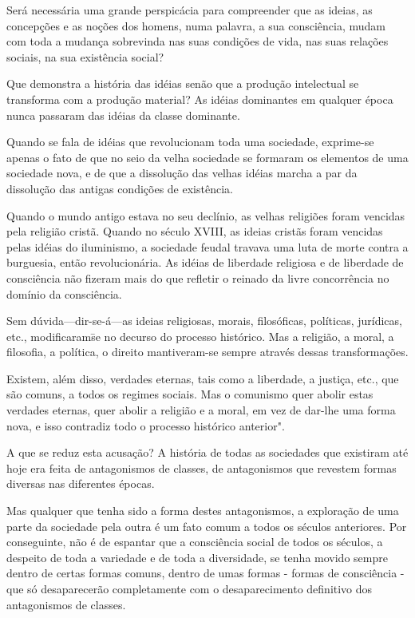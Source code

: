 Será necessária uma grande perspicácia para compreender que as ideias,
as concepções e as noções dos homens, numa palavra, a sua consciência,
mudam com toda a mudança sobrevinda nas suas condições de vida, nas
suas relações sociais, na sua existência social?

Que demonstra a história das idéias senão que a produção intelectual
se transforma com a produção material? As idéias dominantes em
qualquer época nunca passaram das idéias da classe dominante.

Quando se fala de idéias que revolucionam toda uma sociedade,
exprime-se apenas o fato de que no seio da velha sociedade se formaram
os elementos de uma sociedade nova, e de que a dissolução das velhas
idéias marcha a par da dissolução das antigas condições de existência.

Quando o mundo antigo estava no seu declínio, as velhas religiões
foram vencidas pela religião cristã. Quando no século XVIII, as ideias
cristãs foram vencidas pelas idéias do iluminismo, a sociedade feudal
travava uma luta de morte contra a burguesia, então revolucionária. As
idéias de liberdade religiosa e de liberdade de consciência não
fizeram mais do que refletir o reinado da livre concorrência no
domínio da consciência.

Sem dúvida---dir-se-á---as ideias religiosas, morais, filosóficas,
políticas, jurídicas, etc., modificaram\=se no decurso do processo
histórico. Mas a religião, a moral, a filosofia, a política, o direito
mantiveram-se sempre através dessas transformações.

Existem, além disso, verdades eternas, tais como a liberdade, a
justiça, etc., que são comuns, a todos os regimes sociais. Mas o
comunismo quer abolir estas verdades eternas, quer abolir a religião e
a moral, em vez de dar-lhe uma forma nova, e isso contradiz todo o
processo histórico anterior".

A que se reduz esta acusação? A história de todas as sociedades que
existiram até hoje era feita de antagonismos de classes, de
antagonismos que revestem formas diversas nas diferentes épocas.

Mas qualquer que tenha sido a forma destes antagonismos, a exploração
de uma parte da sociedade pela outra é um fato comum a todos os
séculos anteriores. Por conseguinte, não é de espantar que a
consciência social de todos os séculos, a despeito de toda a variedade
e de toda a diversidade, se tenha movido sempre dentro de certas
formas comuns, dentro de umas formas - formas de consciência - que
só desaparecerão completamente com o desaparecimento definitivo dos
antagonismos de classes.

